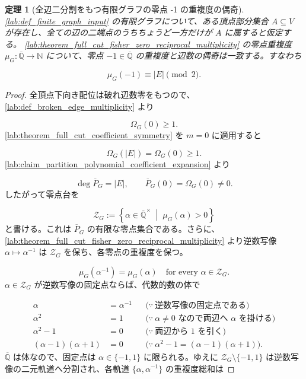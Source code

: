 \documentclass[11pt,a4paper]{article}
\newtheorem{theorem}[definition]{定理}
\theoremstyle{remark}
\begin{document}
\begin{theorem}[全辺二分割をもつ有限グラフの零点 -1 の重複度の偶奇]\label{lab:theorem_full_cut_fisher_zero_minus_one_multiplicity_parity}
\cref{lab:def_finite_graph_input}
 の有限グラフについて、ある頂点部分集合 
$A\subseteq V$
 が存在し、全ての辺の二端点のうちちょうど一方だけが 
$A$
 に属すると仮定する。
\cref{lab:theorem_full_cut_fisher_zero_reciprocal_multiplicity}
 の零点重複度 
$\mu_G:\overline{\mathbb Q}\to\mathbb N$
 について、零点 
$-1\in\overline{\mathbb Q}$
 の重複度と辺数の偶奇は一致する。すなわち

\[\mu_G(-1)\equiv |E|\pmod 2.\]
\end{theorem}
\begin{proof}
全頂点下向き配位は破れ辺数零をもつので、
\cref{lab:def_broken_edge_multiplicity}
 より

\[\Omega_G(0)\geq1.\]
\cref{lab:theorem_full_cut_coefficient_symmetry}
 を 
$m=0$
 に適用すると

\[\Omega_G(|E|)=\Omega_G(0)\geq1.\]
\cref{lab:claim_partition_polynomial_coefficient_expansion}
 より

\[\deg\overline P_G=|E|,
\qquad
\overline P_G(0)=\Omega_G(0)\ne0.\]
したがって零点台を

\[\mathcal Z_G:=
\left\{
  \alpha\in\overline{\mathbb Q}^{\times}
  \;\middle|\;
  \mu_G(\alpha)>0
\right\}\]
と書ける。これは 
$\overline P_G$
 の有限な零点集合である。さらに、
\cref{lab:theorem_full_cut_fisher_zero_reciprocal_multiplicity}
 より逆数写像 
$\alpha\mapsto\alpha^{-1}$
 は 
$\mathcal Z_G$
 を保ち、各零点の重複度を保つ。

\[\mu_G(\alpha^{-1})=\mu_G(\alpha)
\quad\text{for every }\alpha\in\mathcal Z_G.\]
$\alpha\in\mathcal Z_G$
 が逆数写像の固定点ならば、代数的数の体で

\[\begin{aligned}
\alpha
&=\alpha^{-1}
&&\bigl(\because\ \text{逆数写像の固定点である}\bigr)\\
\alpha^2
&=1
&&\bigl(\because\ \alpha\ne0\text{ なので両辺へ }\alpha\text{ を掛ける}\bigr)\\
\alpha^2-1
&=0
&&\bigl(\because\ \text{両辺から }1\text{ を引く}\bigr)\\
(\alpha-1)(\alpha+1)
&=0
&&\bigl(\because\ \alpha^2-1=(\alpha-1)(\alpha+1)\bigr).
\end{aligned}\]
$\overline{\mathbb Q}$
 は体なので、固定点は 
$\alpha\in\{-1,1\}$
 に限られる。ゆえに 
$\mathcal Z_G\setminus\{-1,1\}$
 は逆数写像の二元軌道へ分割され、各軌道 
$\{\alpha,\alpha^{-1}\}$
 の重複度総和は


\end{proof}
\end{document}
